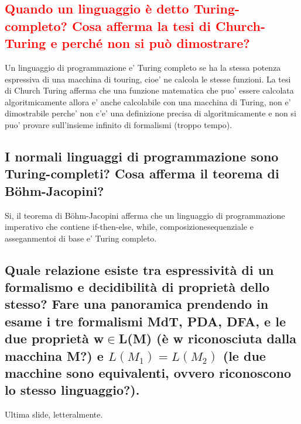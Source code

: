 \documentclass{article}
\begin{document}
\subsection{\textcolor{red}{Quando un linguaggio è detto Turing-completo? Cosa afferma la tesi di Church-Turing e perché non si può dimostrare?}}
Un linguaggio di programmazione e' Turing completo se ha la stessa potenza espressiva di una macchina di touring, cioe' ne calcola le stesse funzioni.
La tesi di Church Turing afferma che una funzione matematica che puo' essere calcolata algoritmicamente allora e' 
anche calcolabile con una macchina di Turing, non e' dimostrabile perche' non c'e' una definizione precisa di algoritmicamente 
e non si puo' provare sull'insieme infinito di formalismi (troppo tempo).
\subsection{I normali linguaggi di programmazione sono Turing-completi? Cosa afferma il teorema di Böhm-Jacopini?}
Si, il teorema di Böhm-Jacopini afferma che un linguaggio di programmazione imperativo che contiene if-then-else, while, composizionesequenziale e asseganmentoi di base e' Turing completo.
\subsection{Quale relazione esiste tra espressività di un formalismo e decidibilità di proprietà dello stesso? 
Fare una panoramica prendendo in esame i tre formalismi MdT, PDA, DFA, e le due proprietà w$\in$L(M) (è w riconosciuta dalla macchina M?) 
e $L(M_1)=L(M_2)$ (le due macchine sono equivalenti, ovvero riconoscono lo stesso linguaggio?).}
Ultima slide, letteralmente.
\end{document}
